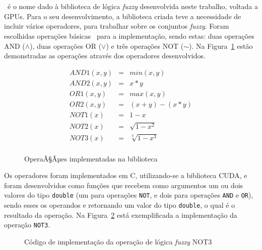 \documentclass[12pt]{article}
\begin{document}
{\section{\libname}
\label{sec:lib}

	\libname~é o nome dado à biblioteca de lógica \textit{fuzzy} desenvolvida neste trabalho, voltada a GPUs. Para o seu desenvolvimento, a biblioteca criada teve a necessidade de incluir vários operadores, para trabalhar sobre os conjuntos \textit{fuzzy}. Foram escolhidas operações básicas~\cite{klir:95} para a implementação, sendo estas: duas operações AND ($\wedge$), duas operações OR ($\vee$) e três operações NOT ($\sim$). Na Figura~\ref{fig:fuzzyops} estão demonstradas as operações através dos operadores desenvolvidos.
	
\begin{figure}[!h]
\centering

\[ \begin{array}{ccc}
	AND1(x, y) & = & min(x, y) \\
	AND2(x, y) & = & x * y \\
	OR1(x, y) & = & max(x, y) \\
	OR2(x, y) & = & (x + y) - (x * y)\\
	NOT1(x) & = & 1 - x \\
	NOT2(x) & = & \sqrt{1-x^2} \\
	NOT3(x) & = & \sqrt[3]{1-x^3} \\
\end{array} \]
\caption{OperaÃ§Ãµes implementadas na biblioteca~\libname}
\label{fig:fuzzyops}
\end{figure}


Os operadores foram implementados em C, utilizando-se a biblioteca CUDA, e foram desenvolvidos como funções que recebem como argumentos um ou dois valores do tipo \texttt{double} (um para operações \texttt{NOT}, e dois para operações \texttt{AND} e \texttt{OR}), sendo esses os operandos e retornando um valor do tipo \texttt{double}, o qual é o resultado da operação. Na Figura~\ref{fig:operation} está exemplificada a implementação da operação \texttt{NOT3}.

\begin{figure}[!h]
\centering

\caption{Código de implementação da operação de lógica \textit{fuzzy} NOT3}
\label{fig:operation}
\end{figure}

}
\end{document}
